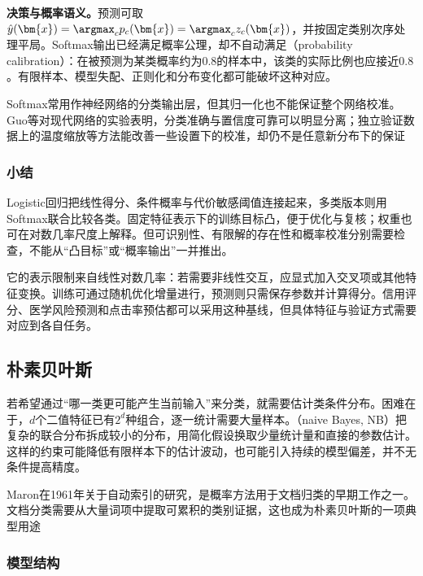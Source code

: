 \textbf{决策与概率语义。}预测可取$\hat y(\bm{x})=\argmax_c p_c(\bm{x})=\argmax_c z_c(\bm{x})$，并按固定类别次序处理平局。Softmax输出已经满足概率公理，却不自动满足（probability calibration）：在被预测为某类概率约为$0.8$的样本中，该类的实际比例也应接近$0.8$。有限样本、模型失配、正则化和分布变化都可能破坏这种对应。

Softmax常用作神经网络的分类输出层，但其归一化也不能保证整个网络校准。Guo等对现代网络的实验表明，分类准确与置信度可靠可以明显分离；独立验证数据上的温度缩放等方法能改善一些设置下的校准，却仍不是任意新分布下的保证

\subsubsection{小结}
\label{sec:classification-logistic-summary}

Logistic回归把线性得分、条件概率与代价敏感阈值连接起来，多类版本则用Softmax联合比较各类。固定特征表示下的训练目标凸，便于优化与复核；权重也可在对数几率尺度上解释。但可识别性、有限解的存在性和概率校准分别需要检查，不能从“凸目标”或“概率输出”一并推出。

它的表示限制来自线性对数几率：若需要非线性交互，应显式加入交叉项或其他特征变换。训练可通过随机优化增量进行，预测则只需保存参数并计算得分。信用评分、医学风险预测和点击率预估都可以采用这种基线，但具体特征与验证方式需要对应到各自任务。

\subsection{朴素贝叶斯}
\label{sec:classification-naive-bayes}

若希望通过“哪一类更可能产生当前输入”来分类，就需要估计类条件分布。困难在于，$d$个二值特征已有$2^d$种组合，逐一统计需要大量样本。（naive Bayes, NB）把复杂的联合分布拆成较小的分布，用简化假设换取少量统计量和直接的参数估计。这样的约束可能降低有限样本下的估计波动，也可能引入持续的模型偏差，并不无条件提高精度。

Maron在1961年关于自动索引的研究，是概率方法用于文档归类的早期工作之一。文档分类需要从大量词项中提取可累积的类别证据，这也成为朴素贝叶斯的一项典型用途

\subsubsection{模型结构}
\label{sec:classification-naive-bayes-structure}

